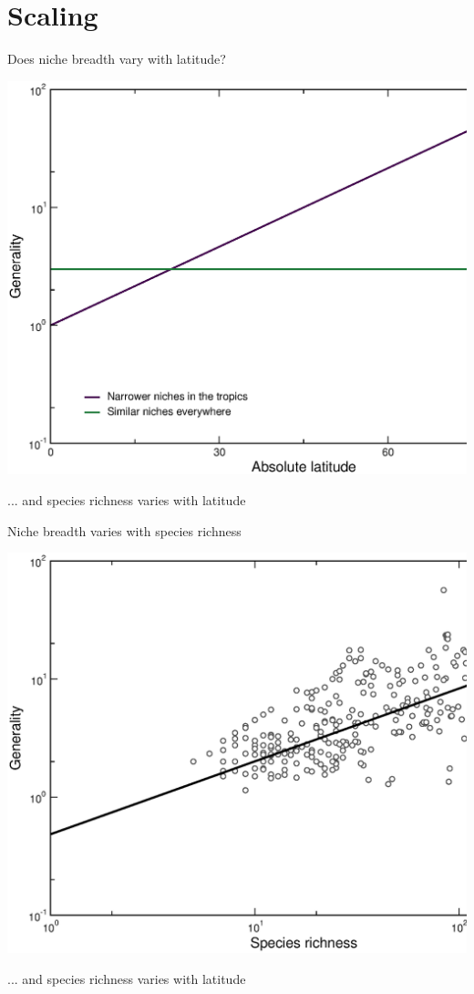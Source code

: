 \documentclass{beamer}
\begin{document}
\section*{Scaling}
  \begin{frame}{Does niche breadth vary with latitude?}

    \begin{center}
      \includegraphics*[width=.8\textwidth]{Figures/results/Gen_vs_lat_simulated.eps}

    \vspace{.5cm}
    {\color{white}... and species richness varies with latitude}
    \end{center}

  \end{frame}


  \begin{frame}{Niche breadth varies with species richness}

    \begin{center}
      \includegraphics*[width=.8\textwidth]{Figures/results/Gen_vs_S_fitline_observed.eps}

    \vspace{.5cm}
    {\color{white}... and species richness varies with latitude}
    \end{center}


  \end{frame}
\end{document}
